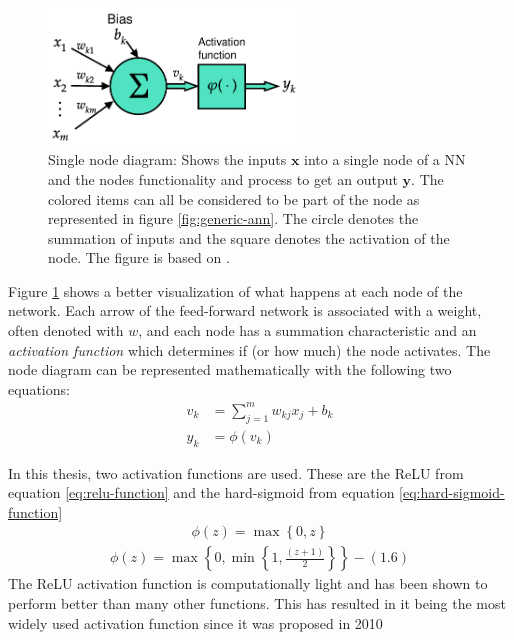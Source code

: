\documentclass[../main.tex]{subfiles}
\begin{document}
\begin{figure}[ht!]
    \centering
    \includegraphics[width=0.6\textwidth]{img/node-diagram}
    \caption{Single node diagram: Shows the inputs $\mathbf{x}$ into a single node of a \ac{NN} and the nodes functionality and process to get an output $\mathbf{y}$. The colored items can all be considered to be part of the node as represented in figure \ref{fig:generic-ann}. The circle denotes the summation of inputs and the square denotes the activation of the node. The figure is based on \cite[Fig. 5]{Haykin2009}.}
    \label{fig:node-diagram}
\end{figure}

Figure \ref{fig:node-diagram} shows a better visualization of what happens at each node of the network.
Each arrow of the feed-forward network is associated with a weight, often denoted with $w$, and each node has a summation characteristic and an \textit{activation function} which determines if (or how much) the node activates.
The node diagram can be represented mathematically with the following two equations:
\begin{subequations}
\label{eq:ann-node}
\begin{align}
    v_k &= \sum_{j=1}^m w_{kj}x_j + b_k \\
    y_k &= \phi (v_k)
\end{align}
\end{subequations}

In this thesis, two activation functions are used.
These are the \ac{ReLU} from equation \ref{eq:relu-function} and the hard-sigmoid from equation \ref{eq:hard-sigmoid-function} \cite{}
\begin{align}
\label{eq:relu-function}
    \phi (z) = \max\left\{0,z\right\}
\end{align}
\begin{align}
\label{eq:hard-sigmoid-function}
    \phi (z) = \max\left\{0,\min\left\{1,\frac{(z+1)}{2}\right\}\right\}-\left(1.6\right)
\end{align}
The \ac{ReLU} activation function is computationally light and has been shown to perform better than many other functions.
This has resulted in it being the most widely used activation function since it was proposed in 2010 
\end{document}
